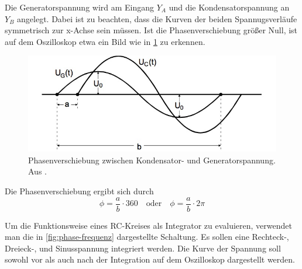 Die Generatorspannung wird am Eingang $Y_A$ und die Kondensatorspannung an $Y_B$ angelegt. Dabei ist zu beachten, dass die Kurven der beiden Spannugsverläufe symmetrisch zur x-Achse sein müssen.
Ist die Phasenverschiebung größer Null, ist auf dem Oszilloskop etwa ein Bild wie in \ref{fig:phasenverschiebung} zu erkennen.

\begin{figure}
  \centering
  \includegraphics[scale=0.5]{content/Phasenverschiebung.jpg}
  \caption{Phasenverschiebung zwischen Kondensator- und Generatorspannung. Aus \cite{anleitung353}.}
  \label{fig:phasenverschiebung}
\end{figure}

Die Phasenverschiebung ergibt sich durch
\begin{equation}
  \phi = \frac{a}{b} \cdot 360 \quad\text{oder}\quad \phi = \frac{a}{b} \cdot 2\pi
\end{equation}

Um die Funktionsweise eines RC-Kreises als Integrator zu evaluieren, verwendet man die in \ref{fig:phase-frequenz} dargestellte Schaltung. Es sollen eine Rechteck-, Dreieck-, und Sinusspannung integriert werden. Die Kurve der Spannung soll sowohl vor als auch nach der Integration auf dem Oszilloskop dargestellt werden.
